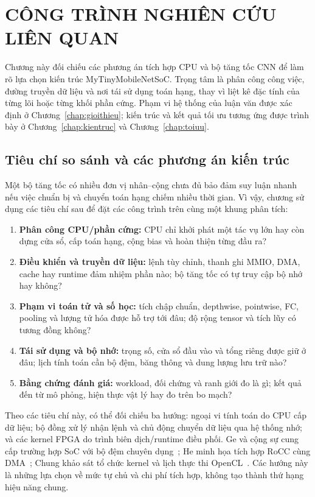 \chapter{CÔNG TRÌNH NGHIÊN CỨU LIÊN QUAN}
\label{chap:lienquan}
Chương này đối chiếu các phương án tích hợp CPU và bộ tăng tốc CNN để làm rõ lựa chọn kiến trúc MyTinyMobileNetSoC. Trọng tâm là phân công công việc, đường truyền dữ liệu và nơi tái sử dụng toán hạng, thay vì liệt kê đặc tính của từng lõi hoặc từng khối phần cứng. Phạm vi hệ thống của luận văn được xác định ở Chương~\ref{chap:gioithieu}; kiến trúc và kết quả tối ưu tương ứng được trình bày ở Chương~\ref{chap:kientruc} và Chương~\ref{chap:toiuu}.

\section{Tiêu chí so sánh và các phương án kiến trúc}
\label{sec:related-criteria}
Một bộ tăng tốc có nhiều đơn vị nhân--cộng chưa đủ bảo đảm suy luận nhanh nếu việc chuẩn bị và chuyển toán hạng chiếm nhiều thời gian. Vì vậy, chương sử dụng các tiêu chí sau để đặt các công trình trên cùng một khung phân tích:
\begin{enumerate}
    \item \textbf{Phân công CPU/phần cứng:} CPU chỉ khởi phát một tác vụ lớn hay còn dựng cửa sổ, cấp toán hạng, cộng bias và hoàn thiện từng đầu ra?
    \item \textbf{Điều khiển và truyền dữ liệu:} lệnh tùy chỉnh, thanh ghi MMIO, DMA, cache hay runtime đảm nhiệm phần nào; bộ tăng tốc có tự truy cập bộ nhớ hay không?
    \item \textbf{Phạm vi toán tử và số học:} tích chập chuẩn, depthwise, pointwise, FC, pooling và lượng tử hóa được hỗ trợ tới đâu; độ rộng tensor và tích lũy có tương đồng không?
    \item \textbf{Tái sử dụng và bộ nhớ:} trọng số, cửa sổ đầu vào và tổng riêng được giữ ở đâu; lịch tính toán cần bộ đệm, băng thông và dung lượng lưu trữ nào?
    \item \textbf{Bằng chứng đánh giá:} workload, đối chứng và ranh giới đo là gì; kết quả đến từ mô phỏng, hiện thực vật lý hay đo trên bo mạch?
\end{enumerate}

Theo các tiêu chí này, có thể đối chiếu ba hướng: ngoại vi tính toán do CPU cấp dữ liệu; bộ đồng xử lý nhận lệnh và chủ động chuyển dữ liệu qua hệ thống nhớ; và các kernel FPGA do trình biên dịch/runtime điều phối. Ge và cộng sự cung cấp trường hợp SoC với bộ đệm chuyên dụng~\cite[Sections~3--4]{ge2019compact}; He minh họa tích hợp RoCC cùng DMA~\cite[Section~3]{he2021design}; Chung khảo sát tổ chức kernel và lịch thực thi OpenCL~\cite[Chapters~3--5]{chung2021optimization}. Các hướng này là những lựa chọn về mức tự chủ và chi phí tích hợp, không tạo thành thứ hạng hiệu năng chung.

